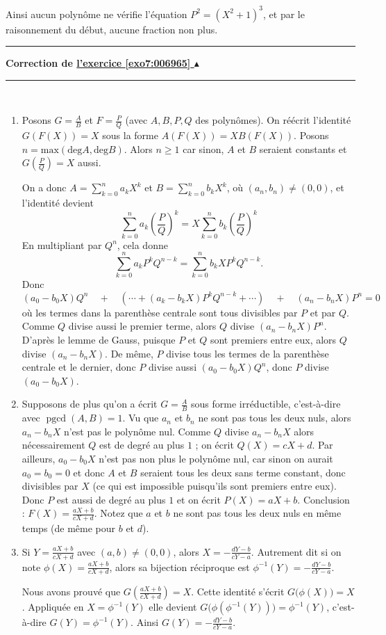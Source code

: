\documentclass[11pt,a4paper]{article}
\renewcommand{\ge}{\geqslant} \renewcommand{\geq}{\geqslant}
\newcommand{\pgcd}{\mathop{\mathrm{pgcd}}\nolimits}
\newcounter{exo}
\newcommand{\correction}[1]{\hypertarget{cor7:#1}{}\label{cor7:#1}{\bf Correction de \hyperlink{exo7:#1}{l'exercice \ref{exo7:#1} $\blacktriangle$}}\vspace{1mm}\hrule\vspace{1mm}}
\newcommand{\fincorrection}{\vspace{1mm}\hrule\vspace*{7mm}}
\begin{document}
Ainsi aucun polynôme ne vérifie l'équation $P^2=(X^2+1)^3$, et 
par le raisonnement du début, aucune fraction non plus.
\fincorrection
\correction{006965}\ 
\begin{enumerate}
\item Posons $G=\frac{A}{B}$ et $F = \frac{P}{Q}$ (avec $A,B,P,Q$ des polynômes).
On réécrit l'identité $G(F(X))=X$ sous la forme $A(F(X))=XB(F(X))$. 
Posons $n=\mathrm{max}(\mathrm{deg}A,\mathrm{deg}B)$.
Alors $n\ge 1$ car sinon, 
$A$ et $B$ seraient constants et $G(\frac{P}{Q})=X$ aussi.

On a donc $A=\sum_{k=0}^na_kX^k$ et $B=\sum_{k=0}^nb_kX^k$, où $(a_n,b_n)\neq(0,0)$, et l'identité devient
$$\sum_{k=0}^na_k\left(\frac{P}{Q}\right)^k=X\sum_{k=0}^nb_k\left(\frac{P}{Q}\right)^k$$
En multipliant par $Q^n$, cela donne
$$\sum_{k=0}^n a_kP^kQ^{n-k}= \sum_{k=0}^n b_k X P^kQ^{n-k}.$$
Donc 
$$(a_0-b_0X)Q^n \quad + \quad (\cdots + (a_k-b_kX) P^kQ^{n-k} + \cdots)\quad + \quad (a_n-b_nX)P^n = 0$$
où les termes dans la parenthèse centrale sont tous divisibles par $P$ et par $Q$. 
Comme $Q$ divise aussi le premier terme, alors $Q$ divise $(a_n-b_nX)P^n$.
D'après le lemme de Gauss, puisque $P$ et $Q$ sont premiers entre eux, alors $Q$ divise $(a_n-b_nX)$. 
De même, $P$ divise tous les termes de la parenthèse centrale et le dernier, donc $P$ divise aussi $(a_0-b_0X)Q^n$, 
donc $P$ divise $(a_0-b_0X)$.

\item Supposons de plus qu'on a écrit $G=\frac{A}{B}$ sous forme irréductible, 
c'est-à-dire avec $\pgcd(A,B)=1$. 
Vu que $a_n$ et $b_n$ ne sont pas tous les deux nuls, alors $a_n-b_nX$ n'est pas le polynôme nul.
Comme $Q$ divise $a_n-b_nX$ alors nécessairement $Q$ est de degré au plus $1$ ; on écrit $Q(X)=cX+d$. 
Par ailleurs, $a_0-b_0X$ n'est pas non plus le polynôme nul, car sinon on aurait $a_0=b_0=0$ et 
donc $A$ et $B$ seraient tous les deux sans terme constant, donc divisibles par $X$ 
(ce qui est impossible puisqu'ils sont premiers entre eux).  
Donc $P$ est aussi de degré au plus $1$ et on écrit $P(X)=aX+b$. 
Conclusion : $F(X)=\frac{aX+b}{cX+d}$.
Notez que $a$ et $b$ ne sont pas tous les deux nuls en même temps (de même pour $b$ et $d$).

\item Si $Y = \frac{aX+b}{cX+d}$ avec $(a,b) \neq (0,0)$,
alors $X = -\frac{dY-b}{cY-a}$. 
Autrement dit si on note
$\phi(X)= \frac{aX+b}{cX+d}$, alors sa bijection réciproque est 
$\phi^{-1}(Y) = -\frac{dY-b}{cY-a}$.

Nous avons prouvé que $G\left( \frac{aX+b}{cX+d}\right) =X$.
Cette identité s'écrit $G\big( \phi(X) \big)=X$.
Appliquée en $X = \phi^{-1}(Y)$ elle devient
$G\big( \phi( \phi^{-1}(Y) ) \big)=\phi^{-1}(Y)$, c'est-à-dire
$G(Y) = \phi^{-1}(Y)$.
Ainsi $G(Y) = -\frac{dY-b}{cY-a}$.
\end{enumerate}
\end{document}
